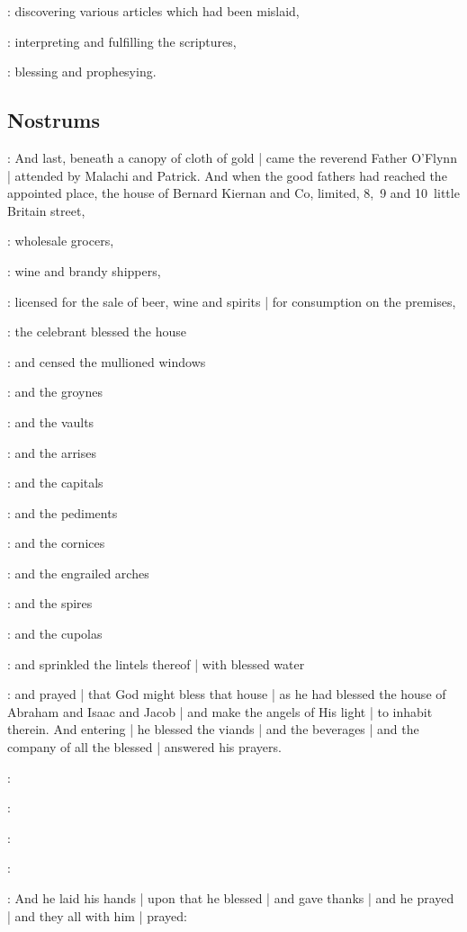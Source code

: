 :
discovering various articles which had been mislaid,

:
interpreting and fulfilling the scriptures,

:
blessing and prophesying.


\subsection*{Nostrums}

:
And last,
beneath a canopy of cloth of gold |
came the reverend Father O'Flynn |
attended by Malachi and Patrick.
And when the good fathers had reached the appointed place,
the house of Bernard Kiernan and Co,
limited,
8,~9 and 10~little Britain street,

:
wholesale grocers,

:
wine and brandy shippers,

:
licensed for the sale of beer,
wine and spirits |
for consumption on the premises,

:
the celebrant blessed the house

:
and censed the mullioned windows

:
and the groynes

:
and the vaults

:
and the arrises

:
and the capitals

:
and the pediments

:
and the cornices

:
and the engrailed arches

:
and the spires

:
and the cupolas

:
and sprinkled the lintels thereof |
with blessed water

:
and prayed |
that God might bless that house |
as he had blessed the house of Abraham and Isaac and Jacob |
and make the angels of His light |
to inhabit therein.
And entering |
he blessed the viands |
and the beverages |
and the company of all the blessed |
answered his prayers.

:

:

:

:

:
And he laid his hands |
upon that he blessed |
and gave thanks |
and he prayed |
and they all with him |
prayed:

